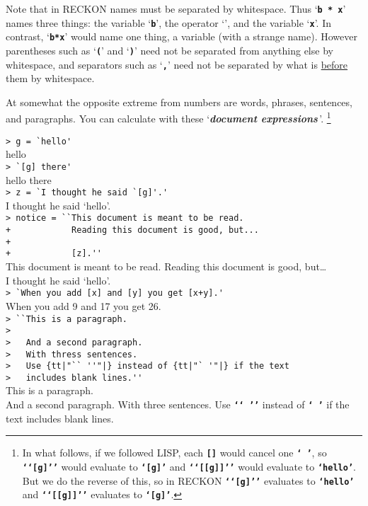 \documentclass[12pt]{article}
\newcommand{\TT}[1]{{\tt \bfseries #1}}
\newcommand{\skey}[2]{{\bf \em #1#2}\index{#1}}
\newenvironment{indpar}[1][0.3in]%
	{\begin{list}{}%
		     {\setlength{\itemsep}{0in}%
		      \setlength{\topsep}{0in}%
		      \setlength{\parsep}{1ex}%
		      \setlength{\labelwidth}{#1}%
		      \setlength{\leftmargin}{#1}%
		      \addtolength{\leftmargin}{\labelsep}}%
	 \item}%
	{\end{list}}
\begin{document}
Note that in RECKON names must be separated by whitespace.  Thus
`\TT{b * x}' names three things: the variable `\TT{b}', the
operator `\TT{*}', and the variable `\TT{x}'.  In contrast,
`\TT{b*x}' would name one thing, a variable (with a strange name).
However parentheses such as `\TT{(}' and `\TT{)}' need not be
separated from anything else by whitespace, and separators such as
`\TT{,}' need not be separated by what is \underline{before} them
by whitespace.

At somewhat the opposite extreme from numbers are words, phrases, sentences,
and paragraphs.  You can calculate with these `\skey{document expression}s\,'.%
\footnote{In what follows,
if we followed LISP, each \TT{[]} would cancel one \TT{`~'},
so \TT{`{}`[g]'{}'} would evaluate to \TT{`[g]'}
and \TT{`{}`[[g]]'{}'} would evaluate to \TT{`hello'}.  But we do the
reverse of this, so in RECKON \TT{`{}`[g]'{}'} evaluates to \TT{`hello'}
and \TT{`{}`[[g]]'{}'} evaluates to \TT{`[g]'}.}

\begin{indpar}
\verb|> g = `hello'| \\
hello \\
\verb|> `[g] there'| \\
hello there \\
\verb|> z = `I thought he said `[g]'.'| \\
I thought he said `hello'. \\
\verb/> notice = ``This document is meant to be read./ \\
\verb/+            Reading this document is good, but.../ \\
\verb/+            / \\
\verb/+            [z].''/ \\
This document is meant to be read.  Reading this document is good, but\ldots
\\[2ex]
I thought he said `hello'. \\
\verb|> `When you add [x] and [y] you get [x+y].'| \\
When you add 9 and 17 you get 26. \\
\verb|> ``This is a paragraph.| \\
\verb|> | \\
\verb|>   And a second paragraph.| \\
\verb|>   With thress sentences.| \\
\verb/>   Use {tt|"`` ''"|} instead of {tt|"` '"|} if the text/ \\
\verb|>   includes blank lines.''| \\
This is a paragraph. \\[2ex]
And a second paragraph. With three sentences. Use
\TT{`{}`~'{}'} instead of \TT{`~'} if the text includes
blank lines.
\end{indpar}
\end{document}
